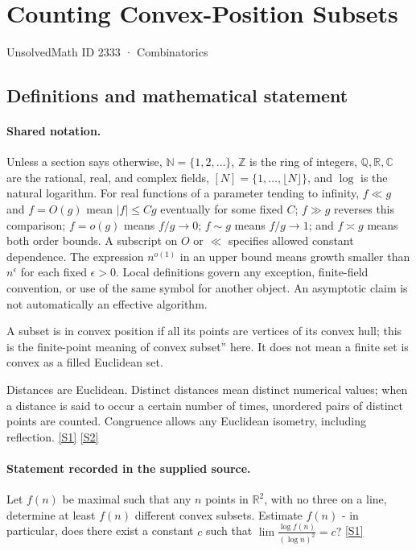\documentclass[11pt,a4paper]{article}
\newcommand{\N}{\mathbb{N}}
\newcommand{\Z}{\mathbb{Z}}
\newcommand{\Q}{\mathbb{Q}}
\newcommand{\R}{\mathbb{R}}
\newcommand{\C}{\mathbb{C}}
\newcommand{\sref}[2]{\hyperlink{source:#1:#2}{[S#2]}}
\begin{document}

\setcounter{section}{2332}

\section{Counting Convex-Position Subsets}\label{2333}

{\small\sffamily UnsolvedMath ID 2333 · Combinatorics}

\subsection{Definitions and mathematical statement}

\paragraph{Shared notation.}Unless a section says otherwise, $\N=\{1,2,\ldots\}$,
$\Z$ is the ring of integers, $\Q,\R,\C$ are the rational, real, and complex
fields, $[N]=\{1,\ldots,\lfloor N\rfloor\}$, and $\log$ is the natural
logarithm. For real functions of a parameter tending to infinity,
$f\ll g$ and $f=O(g)$ mean $|f|\leq Cg$ eventually for some fixed $C$;
$f\gg g$ reverses this comparison; $f=o(g)$ means $f/g\to0$;
$f\sim g$ means $f/g\to1$; and $f\asymp g$ means both order bounds.
A subscript on $O$ or $\ll$ specifies allowed constant dependence.
The expression $n^{o(1)}$ in an upper bound means growth smaller than
$n^\epsilon$ for each fixed $\epsilon>0$. Local definitions govern any
exception, finite-field convention, or use of the same symbol for another
object. An asymptotic claim is not automatically an effective algorithm.



A subset is in convex position if all its points are vertices of its convex hull; this is the finite-point meaning of convex subset'' here. It does not mean a finite set is convex as a filled Euclidean set.

Distances are Euclidean. Distinct distances mean distinct numerical values; when a distance is said to occur a certain number of times, unordered pairs of distinct points are counted. Congruence allows any Euclidean isometry, including reflection. \sref{2333}{1} \sref{2333}{2}

\paragraph{Statement recorded in the supplied source.}
Let $f(n)$ be maximal such that any $n$ points in $\mathbb{R}^2$, with no three on a line, determine at least $f(n)$ different convex subsets. Estimate $f(n)$ - in particular, does there exist a constant $c$ such that $ \lim \frac{\log f(n)}{(\log n)^2}=c? $ \sref{2333}{1}
\end{document}
